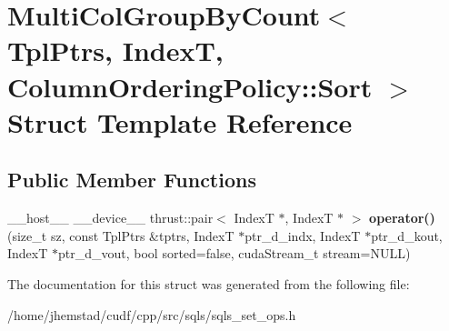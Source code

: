 \hypertarget{structMultiColGroupByCount_3_01TplPtrs_00_01IndexT_00_01ColumnOrderingPolicy_1_1Sort_01_4}{}\section{Multi\+Col\+Group\+By\+Count$<$ Tpl\+Ptrs, IndexT, Column\+Ordering\+Policy\+:\+:Sort $>$ Struct Template Reference}
\label{structMultiColGroupByCount_3_01TplPtrs_00_01IndexT_00_01ColumnOrderingPolicy_1_1Sort_01_4}
\subsection*{Public Member Functions}
\begin{DoxyCompactItemize}
\item 
\+\_\+\+\_\+host\+\_\+\+\_\+ \+\_\+\+\_\+device\+\_\+\+\_\+ thrust\+::pair$<$ IndexT $\ast$, IndexT $\ast$ $>$ {\bfseries operator()} (size\+\_\+t sz, const Tpl\+Ptrs \&tptrs, IndexT $\ast$ptr\+\_\+d\+\_\+indx, IndexT $\ast$ptr\+\_\+d\+\_\+kout, IndexT $\ast$ptr\+\_\+d\+\_\+vout, bool sorted=false, cuda\+Stream\+\_\+t stream=N\+U\+LL)\hypertarget{structMultiColGroupByCount_3_01TplPtrs_00_01IndexT_00_01ColumnOrderingPolicy_1_1Sort_01_4_ab6fb308801bfffedbe89991183c759ea}{}\label{structMultiColGroupByCount_3_01TplPtrs_00_01IndexT_00_01ColumnOrderingPolicy_1_1Sort_01_4_ab6fb308801bfffedbe89991183c759ea}

\end{DoxyCompactItemize}


The documentation for this struct was generated from the following file\+:\begin{DoxyCompactItemize}
\item 
/home/jhemstad/cudf/cpp/src/sqls/sqls\+\_\+set\+\_\+ops.\+h\end{DoxyCompactItemize}
